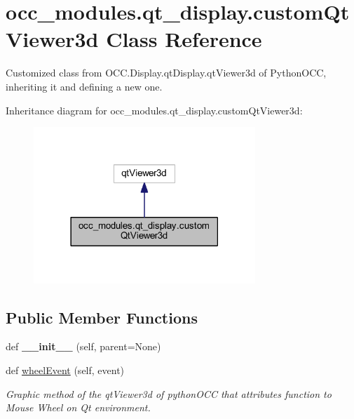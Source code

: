 \hypertarget{a00091}{}\section{occ\+\_\+modules.\+qt\+\_\+display.\+custom\+Qt\+Viewer3d Class Reference}
\label{a00091}


Customized class from O\+C\+C.\+Display.\+qt\+Display.\+qt\+Viewer3d of Python\+O\+CC, inheriting it and defining a new one.  




Inheritance diagram for occ\+\_\+modules.\+qt\+\_\+display.\+custom\+Qt\+Viewer3d\+:
\nopagebreak
\begin{figure}[H]
\begin{center}
\leavevmode
\includegraphics[width=237pt]{a00090}
\end{center}
\end{figure}
\subsection*{Public Member Functions}
\begin{DoxyCompactItemize}
\item 
\hypertarget{a00091_aeef3c40364ac364d1ffc5ba3f5122964}{}\label{a00091_aeef3c40364ac364d1ffc5ba3f5122964} 
def {\bfseries \+\_\+\+\_\+init\+\_\+\+\_\+} (self, parent=None)
\item 
def \hyperlink{a00091_a2031b7d19b3a0c4b0f54fc90218bcdd8}{wheel\+Event} (self, event)
\begin{DoxyCompactList}\small\item\em Graphic method of the qt\+Viewer3d of python\+O\+CC that attributes function to Mouse Wheel on Qt environment. \end{DoxyCompactList}\end{DoxyCompactItemize}


